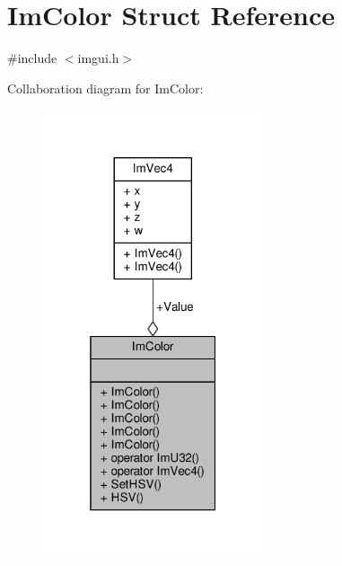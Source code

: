 \hypertarget{structImColor}{}\section{Im\+Color Struct Reference}
\label{structImColor}


{\ttfamily \#include $<$imgui.\+h$>$}



Collaboration diagram for Im\+Color\+:
\nopagebreak
\begin{figure}[H]
\begin{center}
\leavevmode
\includegraphics[width=184pt]{structImColor__coll__graph}
\end{center}
\end{figure}
